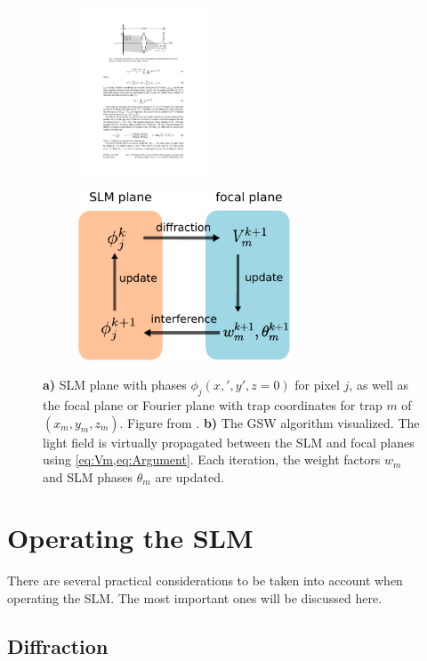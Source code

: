 \begin{figure}
\centering
	\begin{subfigure}{.56\textwidth}
		\centering
		\includegraphics[height=5cm]{figures/SLMgeometry.pdf}
		\caption{}
		\label{fig:SLMgeometry}
	\end{subfigure}
	\begin{subfigure}{.43\textwidth}
		\centering
		\includegraphics[height=5cm]{figures/WeightedGerschbergSaxton.pdf}
		\caption{}
		\label{fig:MOTconcept}
	\end{subfigure}
	\caption{\textbf{a)} SLM plane with phases $\phi_j(x,',y',z=0)$ for pixel $j$, as well as the focal plane or Fourier plane with trap coordinates for trap $m$ of $(x_m,y_m,z_m)$. 
	Figure from \cite{DiLeonardo2007}. 
	\textbf{b)} The \ac{GSW} algorithm visualized.
	The light field is virtually propagated between the SLM and focal planes using \cref{eq:Vm,eq:Argument}. 
	Each iteration, the weight factors $w_m$ and SLM phases $\theta_m$ are updated. }
	\label{fig:GerschbergSaxton}
\end{figure}


\section{Operating the SLM}

There are several practical considerations to be taken into account when operating the SLM. 
The most important ones will be discussed here. 

\subsection{Diffraction}\label{subsec:Diffraction}

